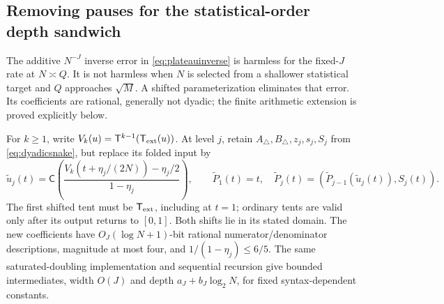 \documentclass[11pt,letterpaper]{article}
\theoremstyle{definition}\newtheorem{definition}[theorem]{Definition}
\theoremstyle{remark}\newtheorem{remark}[theorem]{Remark}
\begin{document}
\subsection{Removing pauses for the statistical-order depth sandwich}
The additive $N^{-J}$ inverse error in \eqref{eq:plateauinverse} is harmless for the fixed-$J$ rate at $N\asymp Q$. It is not harmless when $N$ is selected from a shallower statistical target and $Q$ approaches $\sqrt M$. A shifted parameterization eliminates that error. Its coefficients are rational, generally not dyadic; the finite arithmetic extension is proved explicitly below.

For $k\ge1$, write
$V_k(u)=\mathsf T^{k-1}(\mathsf T_{\rm ext}(u))$.
At level $j$, retain $A_\triangle,B_\triangle,z_j,s_j,S_j$ from \eqref{eq:dyadicsnake}, but replace its folded input by
\begin{equation}\label{eq:nopausesnake}
 \widetilde u_j(t)=\mathsf C\!\left(
 \frac{V_k(t+\eta_j/(2N))-\eta_j/2}{1-\eta_j}\right),\qquad
 \widetilde P_1(t)=t,\quad
 \widetilde P_j(t)=(\widetilde P_{j-1}(\widetilde u_j(t)),S_j(t)).
\end{equation}
The first shifted tent must be $\mathsf T_{\rm ext}$, including at $t=1$; ordinary tents are valid only after its output returns to $[0,1]$. Both shifts lie in its stated domain. The new coefficients have $O_J(\log N+1)$-bit rational numerator/denominator descriptions, magnitude at most four, and $1/(1-\eta_j)\le6/5$. The same saturated-doubling implementation and sequential recursion give bounded intermediates, width $O(J)$ and depth $a_J+b_J\log_2N$, for fixed syntax-dependent constants.
\end{document}
